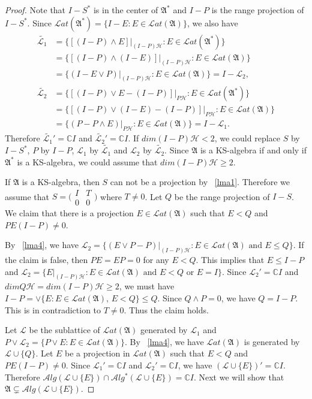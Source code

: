 \documentclass[a4paper,10pt]{amsart}
\theoremstyle{refs}
\newcommand{\AAA}{\mathfrak A}
\newcommand{\HHH}{\mathcal H} %
\newcommand{\LLL}{\mathcal L} %
\newcommand{\Lat}{\mathcal Lat}
\newcommand{\Alg}{\mathcal Alg}
\newcommand{\C}{\mathbb C} %
\begin{document}
\begin{proof}
Note that  $I-S^{*}$ is in the center of $\AAA^{*}$ and $I-P$ is the range
projection of $I-S^{*}$. Since $\Lat(\AAA^{*}) = \{I-E : E
\in \Lat(\AAA) \}$, we also have
\begin{align*}
\widetilde{\LLL_1} &= \{[(I-P) \wedge E] |_{(I-P)\HHH} : E \in
\Lat(\AAA^{*})\} \\
&= \{[(I-P) \wedge (I-E)] |_{(I-P)\HHH} : E \in \Lat(\AAA) \}
\\
& = \{(I - E \vee P) |_{(I-P)\HHH} : E \in \Lat(\AAA) \} = I
- \LLL_{2},\\
\widetilde{\LLL_2} &= \{[(I-P) \vee E -(I-P)]|_{P\HHH} : E \in
\Lat(\AAA^{*}) \}\\
&= \{[(I-P) \vee (I-E) -(I-P)]|_{P\HHH} : E \in \Lat(\AAA)
\}\\
&= \{(P - P \wedge E)|_{P\HHH} : E \in \Lat(\AAA)\} = I
-\LLL_1.
\end{align*}
Therefore $\widetilde{\LLL_1}' = \C I$ and $\widetilde{\LLL_2}' = \C I$.
If $dim(I-P)\HHH < 2$, we could replace $S$ by $I-S^{*}$, $P$ by $I-P$, $\LLL_1$
by $\widetilde{\LLL_1}$ and $\LLL_2$ by $\widetilde{\LLL_2}$. Since $\AAA$ is
a KS-algebra if and only if $\AAA^{*}$ is a KS-algebra, we could assume that
$dim(I-P)\HHH \geq 2$.

If $\AAA$ is a KS-algebra, then $S$ can not be a projection by ~\cref{lma1}.
Therefore we assume that $S =
\bigl(\begin{smallmatrix}
           I & T\\
           0 & 0
           \end{smallmatrix} \bigr)$ where $T \neq 0$. Let $Q$ be the range
projection of $I-S$.
We claim that there is a projection $E \in \Lat(\AAA)$ such that
$E < Q$ and $PE(I-P) \neq 0$.

By ~\cref{lma4}, we have
$\LLL_2 = \{(E \vee P - P)|_{(I-P)\HHH} : E \in \Lat(\AAA) \mbox{ and }
E \leq Q \}$. If the claim is false,
then $PE=EP=0$ for any $E < Q$. This implies that $E \leq I-P$ and
$\LLL_2 = \{E |_{(I-P)\HHH} : E \in \Lat(\AAA) \mbox{ and }
E < Q \mbox{ or } E = I\}$.
Since $\LLL_{2}' = \C I$ and $dimQ\HHH = dim(I-P)\HHH \geq 2$, we must have $I-P
= \vee \{ E : E \in \Lat(\AAA) \mbox{, } E < Q \} \leq Q$. Since $Q \wedge P =
0$, we have $Q = I-P$.
This is in contradiction to $T \neq 0$. Thus the claim holds.

Let $\LLL$ be the sublattice of $\Lat(\AAA)$ generated by $\LLL_1$ and
$P \vee \LLL_{2} = \{P \vee E : E \in \Lat(\AAA) \}$. By ~\cref{lma4},
we have $\Lat(\AAA)$ is generated by $\LLL \cup\{ Q \}$. Let
$E$ be a projection in $\Lat(\AAA)$ such
that $E < Q$ and $PE(I-P)\neq0$. Since $\LLL_1' = \C I$ and $\LLL_2' = \C
I$, we have $(\LLL \cup \{E \})'=\C I$. Therefore $\Alg(\LLL\cup\{E\})
\cap \Alg^{*}(\LLL\cup\{E\}) = \C I$. Next we will show that
$\AAA \subsetneq \Alg(\LLL\cup\{E\})$.


\end{proof}
\end{document}
